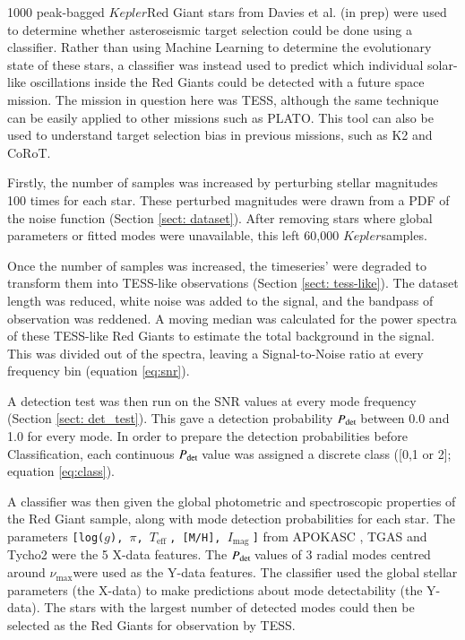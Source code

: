 \documentclass[a4paper,fleqn,usenatbib,useAMS]{mnras}
\newcommand{\numax}{\ensuremath{\nu_{\textrm{max}}}}
\newcommand{\teff}{\ensuremath{T_{\textrm{eff}}\:}}
\newcommand{\kep}{\ensuremath{Kepler}\:}
\newcommand{\pdet}{\ensuremath{P_{\rm det}\:}}
\newcommand{\imag}{\ensuremath{I_{\textrm{mag}}\:}}
\begin{document}
1000 peak-bagged \kep Red Giant stars from Davies et al. (in prep) were used to determine whether asteroseismic target selection could be done using a classifier. Rather than using Machine Learning to determine the evolutionary state of these stars, a classifier was instead used to predict which individual solar-like oscillations inside the Red Giants could be detected with a future space mission. The mission in question here was TESS, although the same technique can be easily applied to other missions such as PLATO. This tool can also be used to understand target selection bias in previous missions, such as K2 and CoRoT.


Firstly, the number of samples was increased by perturbing stellar magnitudes 100 times for each star. These perturbed magnitudes were drawn from a PDF of the noise function (Section \ref{sect: dataset}). After removing stars where global parameters or fitted modes were unavailable, this left 60,000 \kep samples. 

Once the number of samples was increased, the timeseries' were degraded to transform them into TESS-like observations (Section \ref{sect: tess-like}). The dataset length was reduced, white noise was added to the signal, and the bandpass of observation was reddened. A moving median was calculated for the power spectra of these TESS-like Red Giants to estimate the total background in the signal. This was divided out of the spectra, leaving a Signal-to-Noise ratio at every frequency bin (equation \ref{eq:snr}).

A detection test was then run on the SNR values at every mode frequency (Section \ref{sect: det_test}). This gave a detection probability \pdet between 0.0 and 1.0 for every mode. In order to prepare the detection probabilities before Classification, each continuous \pdet value was assigned a discrete class ([0,1 or 2]; equation \ref{eq:class}).

A classifier was then given the global photometric and spectroscopic properties of the Red Giant sample, along with mode detection probabilities for each star. The parameters \texttt{[log($g$), $\pi$, \teff, [M/H], \imag]} from APOKASC \citep{pinsonneault_apokasc_2014}, TGAS \citep{gaia_collaboration_gaia_2016} and Tycho2 \citep{hog_tycho-2_2000} were the 5 X-data features. The \pdet values of 3 radial modes centred around \numax were used as the Y-data features. %
The classifier used the global stellar parameters (the X-data) to make predictions about mode detectability (the Y-data). The stars with the largest number of detected modes could then be selected as the Red Giants for observation by TESS. 
\end{document}
